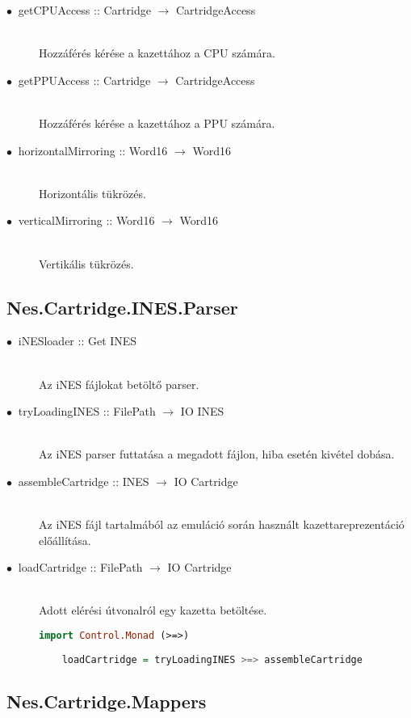 \begin{description}
	\item[$\bullet\:$ getCPUAccess :: Cartridge $\rightarrow$ CartridgeAccess] \hfill \\
	Hozzáférés kérése a kazettához a CPU számára.
	\item[$\bullet\:$ getPPUAccess :: Cartridge $\rightarrow$ CartridgeAccess] \hfill \\
	Hozzáférés kérése a kazettához a PPU számára.
	\item[$\bullet\:$ horizontalMirroring :: Word16 $\rightarrow$ Word16] \hfill \\
	Horizontális tükrözés.
	\item[$\bullet\:$ verticalMirroring :: Word16 $\rightarrow$ Word16] \hfill \\
	Vertikális tükrözés.
\end{description}

\subsection{Nes.Cartridge.INES.Parser}

\begin{description}
	\item[$\bullet\:$ iNESloader :: Get INES] \hfill \\
	Az iNES fájlokat betöltő parser.
	\item[$\bullet\:$ tryLoadingINES :: FilePath $\rightarrow$ IO INES] \hfill \\
	Az iNES parser futtatása a megadott fájlon, hiba esetén kivétel dobása.
	\item[$\bullet\:$ assembleCartridge :: INES $\rightarrow$ IO Cartridge] \hfill \\
	Az iNES fájl tartalmából az emuláció során használt kazettareprezentáció előállítása.
	\item[$\bullet\:$ loadCartridge :: FilePath $\rightarrow$ IO Cartridge] \hfill \\
	Adott elérési útvonalról egy kazetta betöltése.
	\begin{lstlisting}[language=Haskell]
	import Control.Monad (>=>)
	
	loadCartridge = tryLoadingINES >=> assembleCartridge
	\end{lstlisting}
\end{description}

\subsection{Nes.Cartridge.Mappers}

